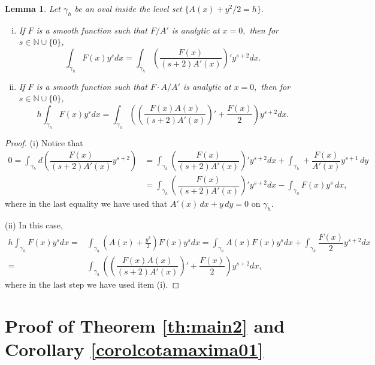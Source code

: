 \documentclass[12pt,a4paper,reqno]{amsart}
\newcommand{\N}{\mathbb{N}}
\newtheorem{lema}[teo]{Lemma}
\begin{document}
\begin{lema}\label{lemaexpoente}
Let $\gamma_h$ be an oval inside the level set $\{A(x) +y^2/2 =
h\}.$
\begin{enumerate}[(i)]

\item If $F$ is a smooth function such that $F/A'$ is analytic
at $x=0,$ then  for  $s \in \N\cup\{0\}$,
$$ \displaystyle\int_{\gamma_h}  F(x) y^{s}dx =  \displaystyle\int_{\gamma_h}  \left( \dfrac{F(x)}{(s+2)A'(x)} \right)' y^{s+2}dx.$$


\item If $F$ is a smooth function such that $F\cdot A/A'$ is analytic
at $x=0,$ then  for  $s \in \N\cup\{0\}$,
$$ h\displaystyle\int_{\gamma_h}  F(x) y^{s}dx =  \displaystyle\int_{\gamma_h}
 \left(\left( \dfrac{F(x)A(x)}{(s+2)A'(x)} \right)'+\dfrac{F(x)}2\right) y^{s+2}dx.$$
\end{enumerate}
\end{lema}

\begin{proof} (i) Notice that
\begin{align*}
 0=\displaystyle\int_{\gamma_h}  d\left( \dfrac{F(x)}{(s+2)A'(x)}
 y^{s+2}\right)&= \displaystyle\int_{\gamma_h}  \left( \dfrac{F(x)}{(s+2)A'(x)}
 \right)'y^{s+2} dx + \displaystyle\int_{\gamma_h} +\dfrac{F(x)}{A'(x)}
 y^{s+1}\,dy\\&=\displaystyle\int_{\gamma_h}  \left( \dfrac{F(x)}{(s+2)A'(x)}
 \right)'y^{s+2} dx -\displaystyle\int_{\gamma_h} F(x)
 y^{s}\,dx,
\end{align*}
where in the last equality we have used that $A'(x)\,dx+y\,dy=0$ on
$\gamma_h.$

(ii) In this case,
\begin{align*}
 h\displaystyle\int_{\gamma_h}  F(x) y^{s}dx =& \displaystyle\int_{\gamma_h}\left(A(x)+\frac{y^2}2\right)  F(x) y^{s}dx=\int_{\gamma_h}
 A(x)F(x) y^{s}dx+\displaystyle\int_{\gamma_h}
\dfrac{F(x)}2 y^{s+2}dx \\=& \displaystyle\int_{\gamma_h}
 \left(\left( \dfrac{F(x)A(x)}{(s+2)A'(x)} \right)'+\dfrac{F(x)}2\right)
 y^{s+2}dx,
 \end{align*}
where in the last step we have used item (i).
\end{proof}






\section{Proof of Theorem \ref{th:main2} and Corollary \ref{corolcotamaxima01}} \label{sec:3}
\end{document}
